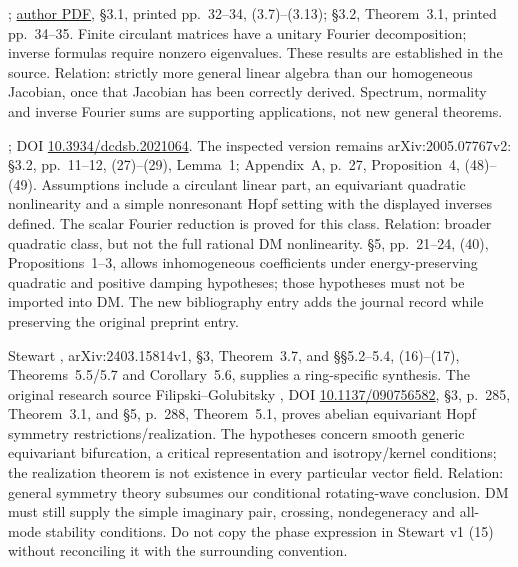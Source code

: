 \begin{description}[style=nextline,leftmargin=0pt,labelwidth=0pt,labelsep=0pt]
\item[S07: Gray (2006).]
\cite{Gray2006}; \href{https://ee.stanford.edu/~gray/toeplitz.pdf}{author PDF},
\S3.1, printed pp.~32--34, (3.7)--(3.13); \S3.2,
Theorem~3.1, printed pp.~34--35. Finite circulant matrices have a unitary
Fourier decomposition; inverse formulas require nonzero eigenvalues.
These results are established in the source. Relation: strictly more
general linear algebra than our homogeneous Jacobian, once that Jacobian
has been correctly derived. Spectrum, normality and inverse Fourier sums
are supporting applications, not new general theorems.

\item[S08: Kerin and Engler, now identified in its published form (2022).]
\cite{KerinEngler2022}; DOI \href{https://doi.org/10.3934/dcdsb.2021064}{10.3934/dcdsb.2021064}.
The inspected version remains arXiv:2005.07767v2: \S3.2,
pp.~11--12, (27)--(29), Lemma~1; Appendix~A, p.~27,
Proposition~4, (48)--(49). Assumptions include a circulant linear part,
an equivariant quadratic nonlinearity and a simple nonresonant Hopf
setting with the displayed inverses defined. The scalar Fourier
reduction is proved for this class. Relation: broader quadratic class,
but not the full rational DM nonlinearity. \S5, pp.~21--24,
(40), Propositions~1--3, allows inhomogeneous coefficients under
energy-preserving quadratic and positive damping hypotheses; those
hypotheses must not be imported into DM. The new bibliography entry
adds the journal record while preserving the original preprint entry.

\item[S09 and S22: equivariant Hopf and phase patterns.]
Stewart \cite{Stewart2024}, arXiv:2403.15814v1,
\S3, Theorem~3.7, and \S\S5.2--5.4, (16)--(17),
Theorems~5.5/5.7 and Corollary~5.6, supplies a ring-specific synthesis.
The original research source Filipski--Golubitsky
\cite{FilipskiGolubitsky2010}, DOI
\href{https://doi.org/10.1137/090756582}{10.1137/090756582},
\S3, p.~285, Theorem~3.1, and \S5, p.~288, Theorem~5.1,
proves abelian equivariant Hopf symmetry restrictions/realization.
The hypotheses concern smooth generic equivariant bifurcation, a critical
representation and isotropy/kernel conditions; the realization theorem
is not existence in every particular vector field. Relation: general
symmetry theory subsumes our conditional rotating-wave conclusion.
DM must still supply the simple imaginary pair, crossing, nondegeneracy
and all-mode stability conditions. Do not copy the phase expression in
Stewart v1 (15) without reconciling it with the surrounding convention.


\end{description}
